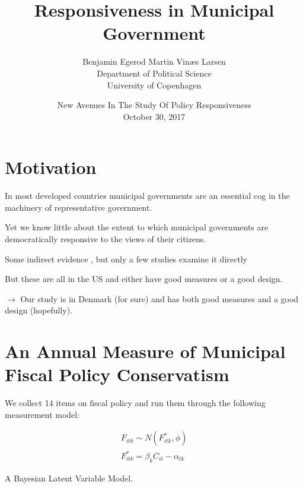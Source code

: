 \documentclass[10pt,aspectratio=169]{beamer}
\title[Municipal Responsiveness]{Responsiveness in Municipal Government}
\author[Egerod \& Larsen]{Benjamin Egerod \qquad Martin Vin\ae s Larsen  \\Department of Political Science \\ University of Copenhagen }
\date[October 30, 2017]{New Avenues In The Study Of Policy	Responsiveness\\ October 30, 2017}
\begin{document}
	
\begin{frame}
\titlepage
\end{frame}

\begin{frame}
\end{frame}

\section{Motivation}

\begin{frame}

In most developed countries municipal governments are an essential cog in the machinery of representative government.

\vspace{0.2in} \pause

Yet we know little about the extent to which municipal governments are democratically responsive to the views of their citizens.

\vspace{0.2in} \pause

Some indirect evidence \citep{blom2006parties,folke2014shades,burnett2017politics}, but only a few studies examine it directly \citep{tausanovitch2014representation,einstein2016pushing,sances2017voters}


\vspace{0.2in} \pause

But these are all in the US and either have good measures or a good design.

$\rightarrow$ Our study is in Denmark (for sure) and has both good measures and a good design (hopefully).
\end{frame}

\section[Measure of Municipal Fiscal Policy Conservatism]{An Annual Measure of Municipal Fiscal Policy Conservatism}

\begin{frame}

We collect 14 items on fiscal policy and run them through the following measurement model:


\vspace{0.2in}

\begin{gather*}
F_{itk} \sim N(F^*_{itk}, \phi)\\
F^*_{itk} = \beta_k C_{it} - \alpha_{tk}
\end{gather*}

\vspace{0.2in}

A Bayesian Latent Variable Model.

\end{frame}
\end{document}
